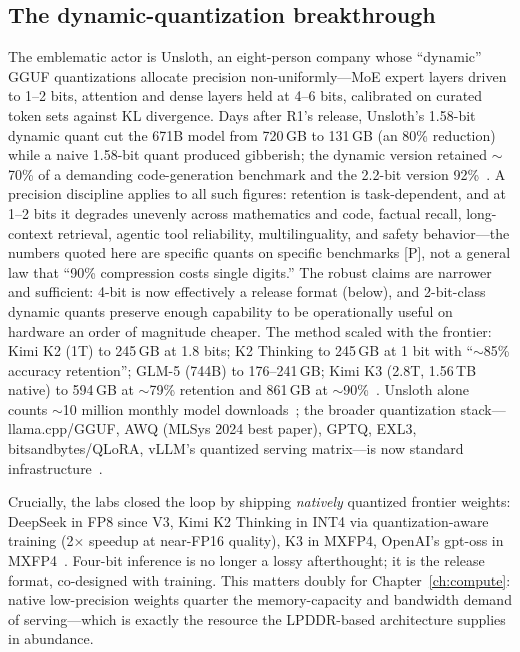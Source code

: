 \subsection{The dynamic-quantization breakthrough}

The emblematic actor is Unsloth, an eight-person company whose ``dynamic'' GGUF quantizations allocate precision non-uniformly---MoE expert layers driven to 1--2 bits, attention and dense layers held at 4--6 bits, calibrated on curated token sets against KL divergence. Days after R1's release, Unsloth's 1.58-bit dynamic quant cut the 671B model from 720\,GB to 131\,GB (an 80\% reduction) while a naive 1.58-bit quant produced gibberish; the dynamic version retained $\sim$70\% of a demanding code-generation benchmark and the 2.2-bit version 92\%~\cite{unsloth-r1}. A precision discipline applies to all such figures: retention is task-dependent, and at 1--2 bits it degrades unevenly across mathematics and code, factual recall, long-context retrieval, agentic tool reliability, multilinguality, and safety behavior---the numbers quoted here are specific quants on specific benchmarks [P], not a general law that ``90\% compression costs single digits.'' The robust claims are narrower and sufficient: 4-bit is now effectively a release format (below), and 2-bit-class dynamic quants preserve enough capability to be operationally useful on hardware an order of magnitude cheaper. The method scaled with the frontier: Kimi K2 (1T) to 245\,GB at 1.8 bits; K2 Thinking to 245\,GB at 1 bit with ``$\sim$85\% accuracy retention''; GLM-5 (744B) to 176--241\,GB; Kimi K3 (2.8T, 1.56\,TB native) to 594\,GB at $\sim$79\% retention and 861\,GB at $\sim$90\%~\cite{unsloth-models}. Unsloth alone counts $\sim$10 million monthly model downloads~\cite{unsloth-yc}; the broader quantization stack---llama.cpp/GGUF, AWQ (MLSys 2024 best paper), GPTQ, EXL3, bitsandbytes/QLoRA, vLLM's quantized serving matrix---is now standard infrastructure~\cite{awq,vllm-quant}.

Crucially, the labs closed the loop by shipping \emph{natively} quantized frontier weights: DeepSeek in FP8 since V3, Kimi K2 Thinking in INT4 via quantization-aware training (2$\times$ speedup at near-FP16 quality), K3 in MXFP4, OpenAI's gpt-oss in MXFP4~\cite{kimi-k2-thinking,kimi-k3,gpt-oss}. Four-bit inference is no longer a lossy afterthought; it is the release format, co-designed with training. This matters doubly for Chapter~\ref{ch:compute}: native low-precision weights quarter the memory-capacity and bandwidth demand of serving---which is exactly the resource the LPDDR-based architecture supplies in abundance.

